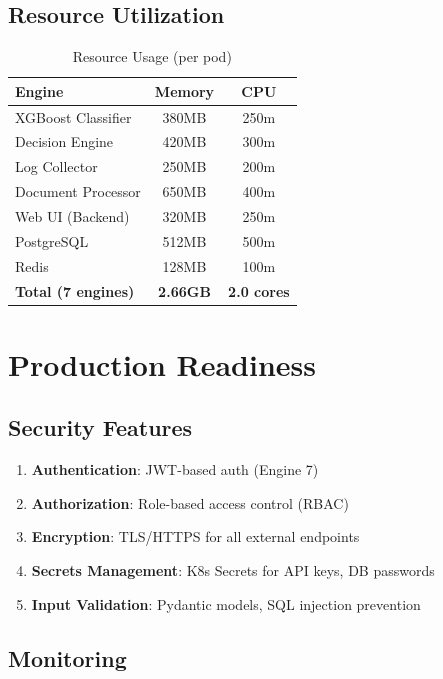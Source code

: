 \documentclass[11pt,conference]{IEEEtran}
\begin{document}
\subsection{Resource Utilization}

\begin{table}[h]
\centering
\caption{Resource Usage (per pod)}
\begin{tabular}{|l|c|c|}
\hline
\textbf{Engine} & \textbf{Memory} & \textbf{CPU} \\
\hline
XGBoost Classifier & 380MB & 250m \\
\hline
Decision Engine & 420MB & 300m \\
\hline
Log Collector & 250MB & 200m \\
\hline
Document Processor & 650MB & 400m \\
\hline
Web UI (Backend) & 320MB & 250m \\
\hline
PostgreSQL & 512MB & 500m \\
\hline
Redis & 128MB & 100m \\
\hline
\textbf{Total (7 engines)} & \textbf{2.66GB} & \textbf{2.0 cores} \\
\hline
\end{tabular}
\end{table}

\section{Production Readiness}

\subsection{Security Features}

\begin{enumerate}
    \item \textbf{Authentication}: JWT-based auth (Engine 7)
    \item \textbf{Authorization}: Role-based access control (RBAC)
    \item \textbf{Encryption}: TLS/HTTPS for all external endpoints
    \item \textbf{Secrets Management}: K8s Secrets for API keys, DB passwords
    \item \textbf{Input Validation}: Pydantic models, SQL injection prevention
\end{enumerate}

\subsection{Monitoring}
\end{document}
